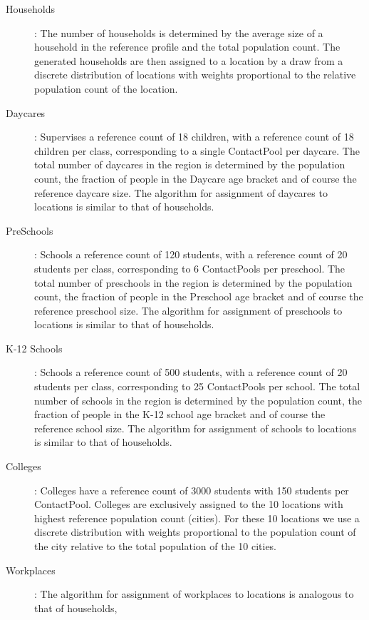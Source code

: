 \begin{description}
    \item[Households]:
        The number of households is determined by the average size of a household in the reference 
        profile and the total population count.
        The generated households are then assigned to a location by a draw from a discrete distribution of 
        locations with weights proportional to the  relative population count of the location.
    \item[Daycares]:
        Supervises a reference count of 18 children, with a reference count of 18 children per class,
         corresponding to a single ContactPool per daycare. 
         The total number of daycares in the region is determined by the population count, the fraction 
         of people in the Daycare age bracket and of course the reference daycare size.
        The algorithm for assignment of daycares to locations is similar to that of households.   
    \item[PreSchools]:
        Schools a reference count of 120 students, with a reference count of 20 students per class,
         corresponding to 6 ContactPools per preschool. 
         The total number of preschools in the region is determined by the population count, the fraction 
         of people in the Preschool age bracket and of course the reference preschool size.
        The algorithm for assignment of preschools to locations is similar to that of households.
    \item[K-12 Schools]:
        Schools a reference count of 500 students, with a reference count of 20 students per class,
         corresponding to 25 ContactPools per school. 
         The total number of schools in the region is determined by the population count, the fraction 
         of people in the K-12 school age bracket and of course the reference school size.
        The algorithm for assignment of schools to locations is similar to that of households.
    \item[Colleges]:
        Colleges have a reference count of 3000 students with 150 students per ContactPool.
        Colleges are exclusively assigned to the 10 locations with highest reference population count (cities).
        For these 10 locations we use a discrete distribution with weights proportional to the population count 
        of the city relative to the total population of the 10 cities.
    \item[Workplaces]:
        The algorithm for assignment of workplaces to locations is analogous to that of households, 

\end{description}
